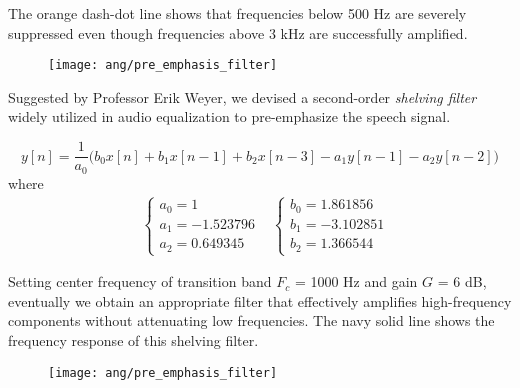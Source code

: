 
\begin{frame}
The \textcolor{orange_matlab}{orange dash-dot line} shows that frequencies below 500 Hz are severely suppressed even though frequencies above 3 kHz are successfully amplified.

\begin{figure}[H]
\centering
\texttt{[image: ang/pre\_emphasis\_filter]}
\end{figure}
\end{frame}


\begin{frame}
Suggested by Professor Erik Weyer, we devised a second-order \textit{shelving filter} widely utilized in audio equalization to pre-emphasize the speech signal.

\begin{equation}
y[n] = \frac{1}{a_0} \Big( b_0 x[n] + b_1 x[n-1] + b_2 x[n-3] - a_1 y[n-1] - a_2 y[n-2] \Big)
\end{equation}
where
\begin{align}
&\begin{cases}
a_0 = 1\\
a_1 = -1.523796\\
a_2 = 0.649345
\end{cases}
&\begin{cases}
b_0 = 1.861856\\
b_1 = -3.102851\\
b_2 = 1.366544
\end{cases}
\end{align}
\end{frame}


\begin{frame}
Setting center frequency of transition band $F_c$ = 1000 Hz and gain $G$ = 6 dB, eventually we obtain an appropriate filter that effectively amplifies high-frequency components without attenuating low frequencies. The \textcolor{navy_matlab}{navy solid line} shows the frequency response of this shelving filter.

\begin{figure}[H]
\centering
\texttt{[image: ang/pre\_emphasis\_filter]}
\end{figure}
\end{frame}

